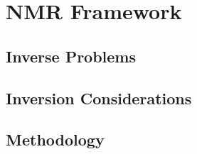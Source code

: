 
\chapter{NMR Framework}
\label{ch:NMR}

\section{Inverse Problems}
\label{sec:inverse}

\section{Inversion Considerations}
\label{sec:consider}

\section{Methodology}
\label{sec:method}
